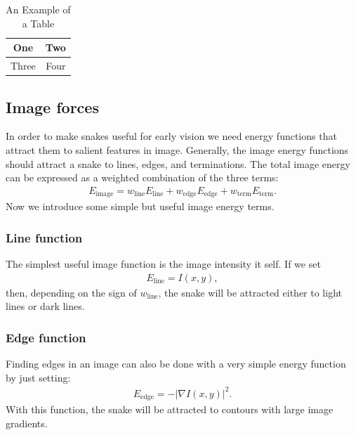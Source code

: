 \documentclass[journal]{IEEEtran}
\begin{document}
\begin{table}[!t]
\renewcommand{\arraystretch}{1.3}
\caption{An Example of a Table}
\label{table_example}
\centering
\begin{tabular}{|c||c|}
\hline
One & Two\\
\hline
Three & Four\\
\hline
\end{tabular}
\end{table}
\subsection{Image forces}
In order to make snakes useful for early vision we need energy functions that attract them to salient features in image. Generally, the image energy functions should attract a snake to lines, edges, and terminations. The total image energy can be expressed as a weighted combination of the three terms:
\begin{equation}\begin{aligned}
E_{\text{image}}=w_{\text{line}}E_{\text{line}}+w_{\text{edge}}E_{\text{edge}}+w_{\text{term}}E_{\text{term}}.
\end{aligned}\end{equation}
Now we introduce some simple but useful image energy terms.
\subsubsection{Line function}
The simplest useful image function is the image intensity it self. If we set
\begin{equation}\begin{aligned}
E_{\text{line}}=I(x,y),
\end{aligned}\end{equation}
then, depending on the sign of $w_{\text{line}}$, the snake will be attracted either to light lines or dark lines.
\subsubsection{Edge function}
Finding edges in an image can also be done with a very simple energy function by just setting:
\begin{equation}\begin{aligned}
E_{\text{edge}}=-|\nabla I(x,y)|^2.\label{eq4}
\end{aligned}\end{equation}
With this function, the snake will be attracted to contours with large image gradients.
\end{document}
